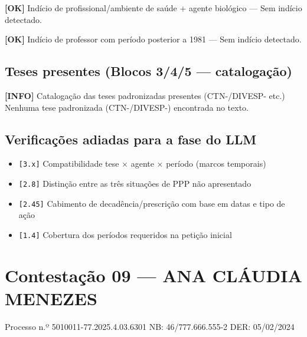 \documentclass[12pt,a4paper]{article}
\newcommand{\statusOK}[1]{\textcolor{corOK}{\textbf{[OK]}} #1}
\newcommand{\statusINFO}[1]{\textcolor{corINFO}{\textbf{[INFO]}} #1}
\begin{document}
\medskip
\statusOK{Indício de profissional/ambiente de saúde + agente biológico} --- Sem indício detectado.

\medskip
\statusOK{Indício de professor com período posterior a 1981} --- Sem indício detectado.

\subsection{Teses presentes (Blocos 3/4/5 --- catalogação)}

\statusINFO{Catalogação das teses padronizadas presentes (CTN-/DIVESP- etc.)}\\
Nenhuma tese padronizada (CTN-/DIVESP-) encontrada no texto.

\subsection{Verificações adiadas para a fase do LLM}

\begin{itemize}
  \item \texttt{[3.x]} Compatibilidade tese × agente × período (marcos temporais)
  \item \texttt{[2.8]} Distinção entre as três situações de PPP não apresentado
  \item \texttt{[2.45]} Cabimento de decadência/prescrição com base em datas e tipo de ação
  \item \texttt{[1.4]} Cobertura dos períodos requeridos na petição inicial
\end{itemize}



\clearpage
{}
\section{Contestação 09 --- ANA CLÁUDIA MENEZES}
\begin{center}
  {\small Processo n.º 5010011-77.2025.4.03.6301 \quad NB: 46/777.666.555-2 \quad DER: 05/02/2024}
\end{center}
\end{document}
